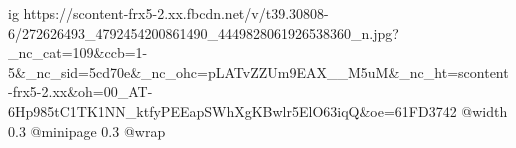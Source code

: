  
 
 
 
 

\ifcmt
  ig https://scontent-frx5-2.xx.fbcdn.net/v/t39.30808-6/272626493_4792454200861490_4449828061926538360_n.jpg?_nc_cat=109&ccb=1-5&_nc_sid=5cd70e&_nc_ohc=pLATvZZUm9EAX__M5uM&_nc_ht=scontent-frx5-2.xx&oh=00_AT-6Hp985tC1TK1NN_ktfyPEEapSWhXgKBwlr5ElO63iqQ&oe=61FD3742
  @width 0.3
  @minipage 0.3
  @wrap \parpic[l]
\fi
